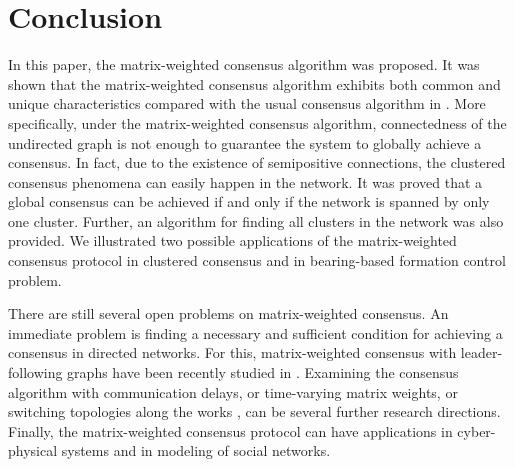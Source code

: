 \documentclass[draftclsnofoot,11pt,onecolumn]{IEEEtran}
\begin{document}
\section{Conclusion}
\label{sec:6}
In this paper, the matrix-weighted consensus algorithm was proposed. It was shown that the matrix-weighted consensus algorithm exhibits both common and unique characteristics compared with the usual consensus algorithm in \cite{Olfati2004}. More specifically, under the matrix-weighted consensus algorithm, connectedness of the undirected graph is not enough to guarantee the system to globally achieve a consensus. In fact, due to the existence of semipositive connections, the clustered consensus phenomena can easily happen in the network. It was proved that a global consensus can be achieved if and only if the network is spanned by only one cluster. Further, an algorithm for finding all clusters in the network was also provided. We illustrated two possible applications of the matrix-weighted consensus protocol in clustered consensus and in bearing-based formation control problem. 

There are still several open problems on matrix-weighted consensus. An immediate problem is finding a necessary and sufficient condition for achieving a consensus in directed networks. For this, matrix-weighted consensus with leader-following graphs have been recently studied in \cite{Trinh2017ASCC}. Examining the consensus algorithm with communication delays, or time-varying matrix weights, or switching topologies along the works \cite{cao2012distributed,kan2016leader}, can be several further research directions. Finally, the matrix-weighted consensus protocol can have applications in cyber-physical systems and in modeling of social networks.

%

\end{document}
